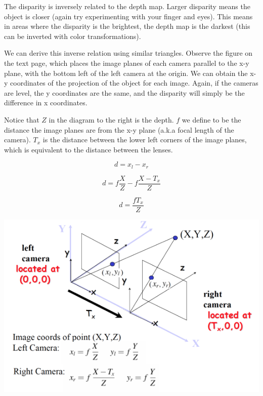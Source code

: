 \documentclass{article}
\begin{document}
The disparity is inversely related to the depth map. Larger disparity means the object is closer (again try experimenting with your finger and eyes). This means in areas where the disparity is the brightest, the depth map is the darkest (this can be inverted with color transformations). 

We can derive this inverse relation using similar triangles. Observe the figure on the text page, which places the image planes of each camera parallel to the x-y plane, with the bottom left of the left camera at the origin. We can obtain the x-y coordinates of the projection of the object for each image. Again, if the cameras are level, the y coordinates are the same, and the disparity will simply be the difference in x coordinates. 

\begin{minipage}{.35\textwidth}
Notice that $Z$ in the diagram to the right is the depth. $f$ we define to be the distance the image planes are from the x-y plane (a.k.a focal length of the camera). $T_x$ is the distance between the lower left corners of the image planes, which is equivalent to the distance between the lenses.

    $$ d = x_l-x_r$$
    
    $$ d = f\frac{X}{Z} - f\frac{X-T_x}{Z}$$
    
    $$ d = \frac{fT_x}{Z}$$


\end{minipage}
\hspace{20pt}
\begin{minipage}{.65\textwidth}
\begin{center}
    \includegraphics[width=1\textwidth]{cam1.png}
  \end{center}
\end{minipage}
\end{document}
